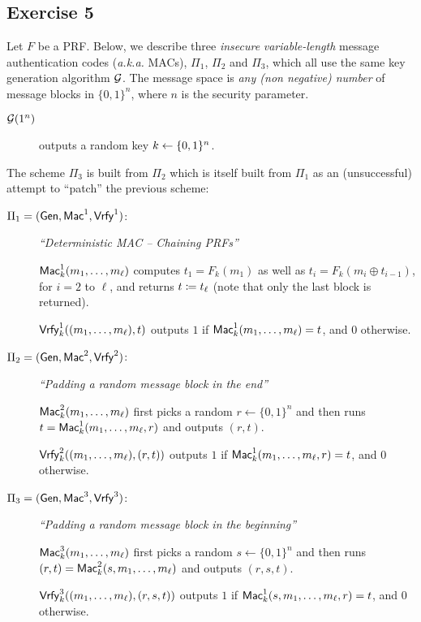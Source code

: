 \subsection{Exercise 5}

Let $F$ be a PRF. Below, we describe three \textit{insecure} \emph{variable-length} message authentication codes (\textit{a.k.a.} MACs), $\Pi_1$, $\Pi_2$ and $\Pi_3$, which all use the same key generation algorithm $\mathcal{G}$. The message space is \emph{any (non negative) number} of message blocks in $\{0,1\}^n$, where $n$ is the security parameter.
%
\begin{description}
	\item[$\mathcal{G}(1^n)$] outputs a random key $k\gets\{0, 1\}^n$.
\end{description}
%
The scheme $\Pi_3$ is built from $\Pi_2$ which is itself built from $\Pi_1$ as an (unsuccessful) attempt to ``patch'' the previous scheme:
%
\begin{description}
	\item[$\Pi_1=(\operatorname{\mathsf{Gen}},\operatorname{\mathsf{Mac}}^1,\operatorname{\mathsf{Vrfy}}^1)$:]
	\emph{``Deterministic MAC -- Chaining PRFs''}

	$\operatorname{\mathsf{Mac}}^1_k(m_1,\ldots,m_\ell)$ computes $t_1=F_k(m_1)$ as well as
	$t_i=F_k(m_i\oplus t_{i-1})$, for $i=2$ to $\ell$, and returns $t \coloneqq t_\ell$ (note that only the last block is returned).

	$\operatorname{\mathsf{Vrfy}}^1_k((m_1,\ldots,m_{\ell}),t)$ outputs $1$ if
	$\operatorname{\mathsf{Mac}}^1_k(m_1,\ldots,m_{\ell})=t$, and 0 otherwise.
	\item[$\Pi_2=(\operatorname{\mathsf{Gen}},\operatorname{\mathsf{Mac}}^2,\operatorname{\mathsf{Vrfy}}^2)$:]
	\emph{``Padding a random message block in the end''}

	$\operatorname{\mathsf{Mac}}^2_k(m_1,\ldots,m_\ell)$ first picks a random $r\gets\{0,1\}^n$ and
	then runs $t=\operatorname{\mathsf{Mac}}_k^1(m_1,\ldots,m_\ell,r)$ and outputs $(r,t)$.

	$\operatorname{\mathsf{Vrfy}}^2_k((m_1,\ldots,m_{\ell}),(r,t))$ outputs $1$ if
	$\operatorname{\mathsf{Mac}}^1_k(m_1,\ldots,m_{\ell},r)=t$, and 0 otherwise.

	\item[$\Pi_3=(\operatorname{\mathsf{Gen}},\operatorname{\mathsf{Mac}}^3,\operatorname{\mathsf{Vrfy}}^3)$:]
	\emph{``Padding a random message block in the beginning''}

	$\operatorname{\mathsf{Mac}}^3_k(m_1,\ldots,m_\ell)$ first picks a random $s\gets\{0,1\}^n$ and
	then runs $(r,t)=\operatorname{\mathsf{Mac}}_k^2(s,m_1,\ldots,m_\ell)$ and outputs $(r,s,t)$.

	$\operatorname{\mathsf{Vrfy}}^3_k((m_1,\ldots,m_{\ell}),(r,s,t))$ outputs $1$ if
	$\operatorname{\mathsf{Mac}}^1_k(s,m_1,\ldots,m_{\ell},r)=t$, and 0 otherwise.
\end{description}

